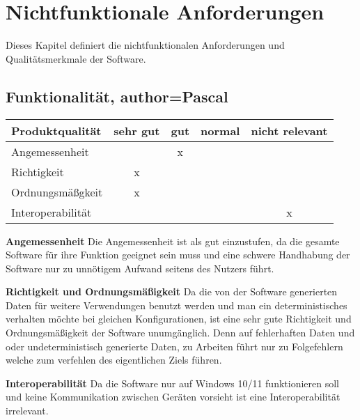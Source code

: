 \documentclass[parskip=full]{scrartcl} %
\begin{document}
\section{Nichtfunktionale Anforderungen}

Dieses Kapitel definiert die nichtfunktionalen Anforderungen und Qualitätsmerkmale der Software.





\subsection{Funktionalität, author=Pascal}

\begin{tabular}{|l| c| c| c| c|}
    \hline
        Produktqualität & sehr gut & gut & normal & nicht relevant \\
    \hline
        Angemessenheit & & x & &\\
    \hline
        Richtigkeit & x & & &\\
    \hline
        Ordnungsmäßgkeit & x & & &\\
    \hline
        Interoperabilität & & & & x\\
    \hline
        
    \end{tabular}

\textbf{Angemessenheit}
\newline
Die Angemessenheit ist als gut einzustufen, da die gesamte Software für ihre Funktion geeignet sein muss und eine schwere Handhabung der Software nur zu unnötigem Aufwand seitens des Nutzers führt.

\textbf{Richtigkeit und Ordnungsmäßigkeit}
\newline
Da die von der Software generierten Daten für weitere Verwendungen benutzt werden und man ein deterministisches verhalten möchte bei gleichen Konfigurationen, ist eine sehr gute Richtigkeit und Ordnungsmäßigkeit der Software unumgänglich. Denn auf fehlerhaften Daten und oder undeterministisch generierte Daten, zu Arbeiten führt nur zu Folgefehlern welche zum verfehlen des eigentlichen Ziels führen.

\textbf{Interoperabilität}
\newline
Da die Software nur auf Windows 10/11 funktionieren soll und keine Kommunikation zwischen Geräten vorsieht ist eine Interoperabilität irrelevant.
\end{document}
